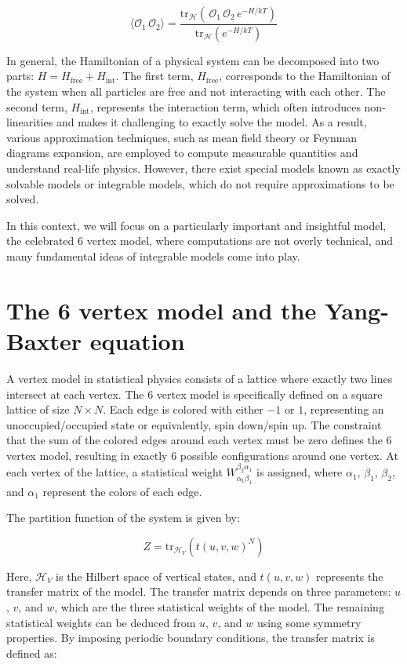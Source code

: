 \documentclass[11pt]{article}
\theoremstyle{definition}
\begin{document}
\[ \langle \mathcal{O}_1\,\mathcal{O}_2 \rangle = \frac{\text{tr}_\mathcal{H} \left( \, \mathcal{O}_1\,\mathcal{O}_2 \, e^{-H /kT}\right)}{\text{tr}_\mathcal{H} \left(e^{-H /kT}\right)} \]

In general, the Hamiltonian of a physical system can be decomposed into two parts: \(H = H_{\text{free}} + H_{\text{int}}\). The first term, \(H_{\text{free}}\), corresponds to the Hamiltonian of the system when all particles are free and not interacting with each other. The second term, \(H_{\text{int}}\), represents the interaction term, which often introduces non-linearities and makes it challenging to exactly solve the model. As a result, various approximation techniques, such as mean field theory or Feynman diagrams expansion, are employed to compute measurable quantities and understand real-life physics. However, there exist special models known as exactly solvable models or integrable models, which do not require approximations to be solved.

In this context, we will focus on a particularly important and insightful model, the celebrated 6 vertex model, where computations are not overly technical, and many fundamental ideas of integrable models come into play.


\section{\Large \textbf{The 6 vertex model and the Yang-Baxter equation}}
A vertex model in statistical physics consists of a lattice where exactly two lines intersect at each vertex. The 6 vertex model is specifically defined on a square lattice of size \(N \times N\). Each edge is colored with either \(-1\) or \(1\), representing an unoccupied/occupied state or equivalently, spin down/spin up. The constraint that the sum of the colored edges around each vertex must be zero defines the 6 vertex model, resulting in exactly 6 possible configurations around one vertex. At each vertex of the lattice, a statistical weight \(W_{\alpha_{1}\beta_{1}}^{\beta_2\alpha_1}\) is assigned, where \(\alpha_{1}\), \(\beta_{1}\), \(\beta_{2}\), and \(\alpha_1\) represent the colors of each edge. 

The partition function of the system is given by:

\[Z=\text{tr}_{\mathcal{H}_{V}}(t(u,v,w)^N)\]

Here, \(\mathcal{H}_{V}\) is the Hilbert space of vertical states, and \(t(u,v,w)\) represents the transfer matrix of the model. The transfer matrix depends on three parameters: \(u\), \(v\), and \(w\), which are the three statistical weights of the model. The remaining statistical weights can be deduced from \(u\), \(v\), and \(w\) using some symmetry properties. By imposing periodic boundary conditions, the transfer matrix is defined as:
\end{document}
